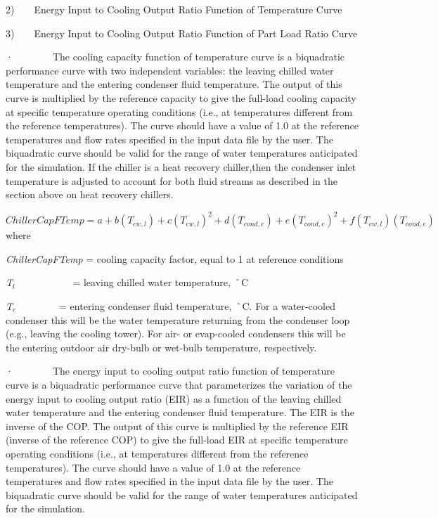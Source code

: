 2)~~~~Energy Input to Cooling Output Ratio Function of Temperature Curve

3)~~~~Energy Input to Cooling Output Ratio Function of Part Load Ratio Curve

·~~~~~~~~The cooling capacity function of temperature curve is a biquadratic performance curve with two independent variables: the leaving chilled water temperature and the entering condenser fluid temperature. The output of this curve is multiplied by the reference capacity to give the full-load cooling capacity at specific temperature operating conditions (i.e., at temperatures different from the reference temperatures). The curve should have a value of 1.0 at the reference temperatures and flow rates specified in the input data file by the user. The biquadratic curve should be valid for the range of water temperatures anticipated for the simulation. If the chiller is a heat recovery chiller,then the condenser inlet temperature is adjusted to account for both fluid streams as described in the section above on heat recovery chillers.

\(ChillerCapFTemp = a + b\left( {{T_{cw,l}}} \right) + c{\left( {{T_{cw,l}}} \right)^2} + d\left( {{T_{cond,e}}} \right) + e{\left( {{T_{cond,e}}} \right)^2} + f\left( {{T_{cw,l}}} \right)\left( {{T_{cond,e}}} \right)\) where

\emph{ChillerCapFTemp} = cooling capacity factor, equal to 1 at reference conditions

\emph{T\(_{l}\)}~~~~~~~~~~~ = leaving chilled water temperature, ˚C

\emph{T\(_{e}\)}~~~~~~~~ = entering condenser fluid temperature, ˚C. For a water-cooled condenser this will be the water temperature returning from the condenser loop (e.g., leaving the cooling tower). For air- or evap-cooled condensers this will be the entering outdoor air dry-bulb or wet-bulb temperature, respectively.

·~~~~~~~~The energy input to cooling output ratio function of temperature curve is a biquadratic performance curve that parameterizes the variation of the energy input to cooling output ratio (EIR) as a function of the leaving chilled water temperature and the entering condenser fluid temperature. The EIR is the inverse of the COP. The output of this curve is multiplied by the reference EIR (inverse of the reference COP) to give the full-load EIR at specific temperature operating conditions (i.e., at temperatures different from the reference temperatures). The curve should have a value of 1.0 at the reference temperatures and flow rates specified in the input data file by the user. The biquadratic curve should be valid for the range of water temperatures anticipated for the simulation.

